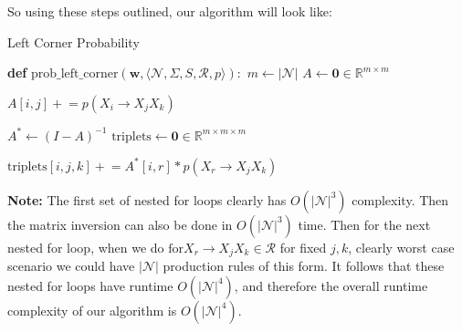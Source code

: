 \documentclass[a4paper]{article}
\begin{document}
So using these steps outlined, our algorithm will look like:

\begin{algorithm}
\caption{Left Corner Probability}
\begin{algorithmic}
\State  \textbf{def} $\mathrm{prob\_left\_corner} (\bm{w}, \langle \mathcal{N}, \Sigma, S, \mathcal{R}, p \rangle):$
\State $m \gets \left| \mathcal{N} \right| $
\State $A \gets \bm{0} \in \mathbb{R}^{m\times m}$

            \State $A[i, j] \mathrel{+}= p(X_i \to  X_j X_k)$
        \EndFor
    \EndFor
\EndFor

\State $A^* \gets (I - A)^{-1}$ 
\State $\text{triplets} \gets \bm{0} \in \mathbb{R}^{m\times m \times m}$ 

            \State $\text{triplets}[i, j, k] \mathrel{+}= A^*[i,r] * p(X_r \to X_j X_k)$
            \EndFor
        \EndFor
    \EndFor
\EndFor

\State {}
\end{algorithmic}
\end{algorithm}

\textbf{Note:} The first set of nested for loops clearly has $O(| \mathcal{N} |^3)$ complexity. Then the matrix inversion can
also be done in $O(| \mathcal{N}|^3)$ time. Then for the next nested for loop,
when we do $\text{for} X_r \to X_j X_k \in \mathcal{R}$ for fixed $j, k$, clearly
worst case scenario we could have $|\mathcal{N}|$ production rules of this form.
It follows that these nested for loops have runtime $O(| \mathcal{N}|^4)$, and therefore
the overall runtime complexity of our algorithm is $O(| \mathcal{N}|^4)$.
\end{document}
